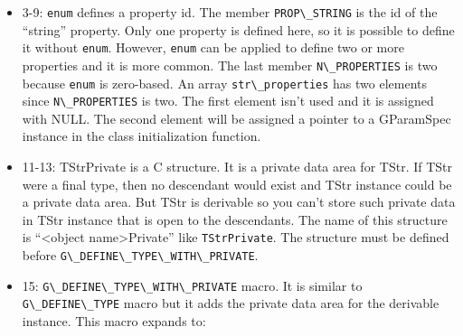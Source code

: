 \begin{itemize}
\tightlist
\item
  3-9: \passthrough{\lstinline!enum!} defines a property id. The member
  \passthrough{\lstinline!PROP\_STRING!} is the id of the ``string''
  property. Only one property is defined here, so it is possible to
  define it without \passthrough{\lstinline!enum!}. However,
  \passthrough{\lstinline!enum!} can be applied to define two or more
  properties and it is more common. The last member
  \passthrough{\lstinline!N\_PROPERTIES!} is two because
  \passthrough{\lstinline!enum!} is zero-based. An array
  \passthrough{\lstinline!str\_properties!} has two elements since
  \passthrough{\lstinline!N\_PROPERTIES!} is two. The first element
  isn't used and it is assigned with NULL. The second element will be
  assigned a pointer to a GParamSpec instance in the class
  initialization function.
\item
  11-13: TStrPrivate is a C structure. It is a private data area for
  TStr. If TStr were a final type, then no descendant would exist and
  TStr instance could be a private data area. But TStr is derivable so
  you can't store such private data in TStr instance that is open to the
  descendants. The name of this structure is ``\textless object
  name\textgreater Private'' like \passthrough{\lstinline!TStrPrivate!}.
  The structure must be defined before
  \passthrough{\lstinline!G\_DEFINE\_TYPE\_WITH\_PRIVATE!}.
\item
  15: \passthrough{\lstinline!G\_DEFINE\_TYPE\_WITH\_PRIVATE!} macro. It
  is similar to \passthrough{\lstinline!G\_DEFINE\_TYPE!} macro but it
  adds the private data area for the derivable instance. This macro
  expands to:


\end{itemize}
